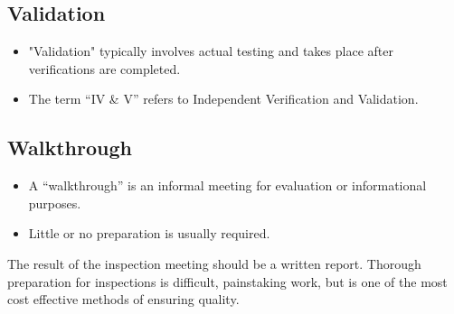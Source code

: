 \documentclass[a4paper,12pt]{article}
\begin{document}
\subsection*{Validation}
\begin{itemize}
\item{"Validation" typically involves actual testing and takes place after verifications are completed.}
\item{The term “IV & V” refers to Independent Verification and Validation.}
\end{itemize}

\subsection*{Walkthrough}
\begin{itemize}
\item{A “walkthrough” is an informal meeting for evaluation or informational purposes.}
\item{Little or no preparation is usually required.}
\end{itemize}

The result of the inspection meeting should be a written report. Thorough preparation for
inspections is difficult, painstaking work, but is one of the most cost effective methods
of ensuring quality.
\end{document}

